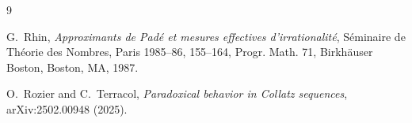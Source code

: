 \documentclass[11pt]{amsart}
\theoremstyle{plain}
\theoremstyle{definition}
\theoremstyle{remark}
\begin{document}

\begin{thebibliography}{9}

G.~Rhin,
\emph{Approximants de Pad\'e et mesures effectives d'irrationalit\'e},
S\'eminaire de Th\'eorie des Nombres, Paris 1985--86, 155--164,
Progr. Math. 71, Birkh\"auser Boston, Boston, MA, 1987.

O.~Rozier and C.~Terracol,
\emph{Paradoxical behavior in Collatz sequences},
arXiv:2502.00948 (2025).

\end{thebibliography}
\end{document}
